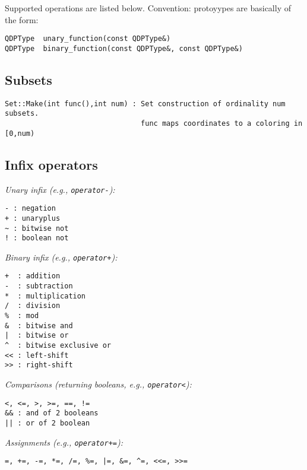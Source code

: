 \documentclass[12pt,letterpaper]{article}
\begin{document}
Supported operations are listed below.
Convention: protoyypes are basically of the form:

\begin{verbatim}
QDPType  unary_function(const QDPType&)
QDPType  binary_function(const QDPType&, const QDPType&)
\end{verbatim}

\medskip

\subsection{Subsets}
\label{sec:subsets}

\begin{verbatim}
Set::Make(int func(),int num) : Set construction of ordinality num subsets.
                                func maps coordinates to a coloring in [0,num)
\end{verbatim}

\medskip

\subsection{Infix operators}
\label{sec:infix}

\noindent
{\em Unary infix (e.g., {\tt operator-}):}

\begin{verbatim}
- : negation
+ : unaryplus
~ : bitwise not
! : boolean not
\end{verbatim}

\noindent
{\em Binary infix (e.g., {\tt operator+}):}

\begin{verbatim}
+  : addition
-  : subtraction
*  : multiplication
/  : division
%  : mod
&  : bitwise and
|  : bitwise or
^  : bitwise exclusive or
<< : left-shift
>> : right-shift
\end{verbatim}

\noindent
{\em Comparisons (returning booleans, e.g., {\tt operator<}):}

\begin{verbatim}
<, <=, >, >=, ==, !=
&& : and of 2 booleans
|| : or of 2 boolean
\end{verbatim}


\noindent
{\em Assignments (e.g., {\tt operator+=}):}

\begin{verbatim}
=, +=, -=, *=, /=, %=, |=, &=, ^=, <<=, >>=
\end{verbatim}
\end{document}
